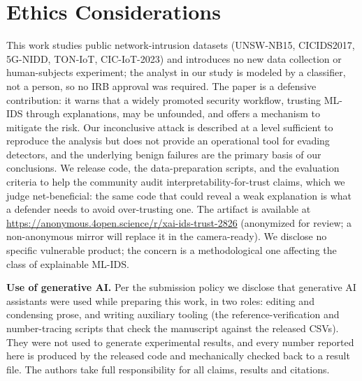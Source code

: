 \documentclass[conference]{IEEEtran}
\begin{document}
\section{Ethics Considerations}\label{sec:ethics}
This work studies public network-intrusion datasets (UNSW-NB15, CICIDS2017, 5G-NIDD, TON-IoT, CIC-IoT-2023) and
introduces no new data collection or human-subjects experiment; the analyst in our study is
modeled by a classifier, not a person, so no IRB approval was required. The paper is a defensive
contribution: it warns that a widely promoted security workflow, trusting ML-IDS through
explanations, may be unfounded, and offers a mechanism to mitigate the risk. Our inconclusive
attack is described at a level sufficient to reproduce the analysis but does not provide an
operational tool for evading detectors, and the underlying benign failures are the primary basis
of our conclusions. We release code, the data-preparation scripts, and the evaluation criteria to help the community
audit interpretability-for-trust claims, which we judge net-beneficial: the same code that could
reveal a weak explanation is what a defender needs to avoid over-trusting one. The artifact is
available at \url{https://anonymous.4open.science/r/xai-ids-trust-2826} (anonymized for review; a
non-anonymous mirror will replace it in the camera-ready). We disclose no specific vulnerable
product; the concern is a methodological one affecting the class of explainable ML-IDS.

\textbf{Use of generative AI.} Per the submission policy we disclose that generative AI assistants
were used while preparing this work, in two roles: editing and condensing prose, and writing
auxiliary tooling (the reference-verification and number-tracing scripts that check the manuscript
against the released CSVs). They were not used to generate experimental results, and every number
reported here is produced by the released code and mechanically checked back to a result file. The
authors take full responsibility for all claims, results and citations.



\end{document}
